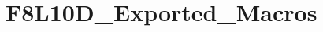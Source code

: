 \hypertarget{group___f8_l10_d___exported___macros}{}\section{F8\+L10\+D\+\_\+\+Exported\+\_\+\+Macros}
\label{group___f8_l10_d___exported___macros}
